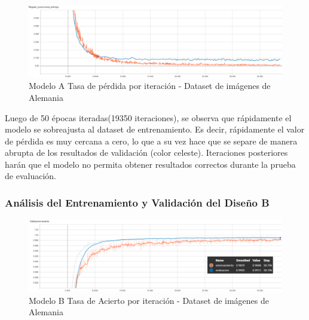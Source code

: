 			\begin{figure}[H]
				\begin{center}
				\includegraphics[width=1\textwidth]{images/desarrollo/trainResults/german/model0Loss} 
				\end{center}
				\begin{center}
				\caption{\small{Modelo A Tasa de pérdida por iteración - Dataset de imágenes de Alemania}}
				
				{\small{\fontsize{10}{16.8}\selectfont {Fuente: Elaboración propia}}}
				\end{center}
				\vspace{-1.5em}
			\end{figure}

			Luego de 50 épocas iteradas(19350 iteraciones), se observa que rápidamente el modelo se sobreajusta al dataset de entrenamiento. Es decir, rápidamente el valor de pérdida es muy cercana a cero, lo que a su vez hace que se separe de manera abrupta de los resultados de validación (color celeste). Iteraciones posteriores harán que el modelo no permita obtener resultados correctos durante la prueba de evaluación.


		\subsubsection{Análisis del Entrenamiento y Validación del Diseño B}  
		
			\begin{figure}[H]
				\begin{center}
				\includegraphics[width=1\textwidth]{images/desarrollo/trainResults/german/model1Acierto} 
				\end{center}
				\begin{center}
				\caption{\small{Modelo B Tasa de Acierto por iteración - Dataset de imágenes de Alemania  }}
				
				{\small{\fontsize{10}{16.8}\selectfont {Fuente: Elaboración propia}}}
				\end{center}
				\vspace{-1.5em}
			\end{figure}
		
